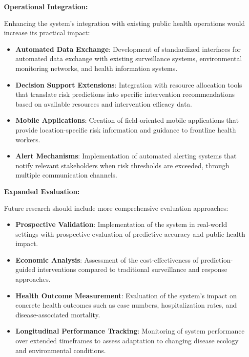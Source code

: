 \documentclass[12pt,a4paper]{report}
\begin{document}
\textbf{Operational Integration:}

Enhancing the system's integration with existing public health operations would increase its practical impact:

\begin{itemize}
    \item \textbf{Automated Data Exchange}: Development of standardized interfaces for automated data exchange with existing surveillance systems, environmental monitoring networks, and health information systems.
    
    \item \textbf{Decision Support Extensions}: Integration with resource allocation tools that translate risk predictions into specific intervention recommendations based on available resources and intervention efficacy data.
    
    \item \textbf{Mobile Applications}: Creation of field-oriented mobile applications that provide location-specific risk information and guidance to frontline health workers.
    
    \item \textbf{Alert Mechanisms}: Implementation of automated alerting systems that notify relevant stakeholders when risk thresholds are exceeded, through multiple communication channels.
\end{itemize}

\textbf{Expanded Evaluation:}

Future research should include more comprehensive evaluation approaches:

\begin{itemize}
    \item \textbf{Prospective Validation}: Implementation of the system in real-world settings with prospective evaluation of predictive accuracy and public health impact.
    
    \item \textbf{Economic Analysis}: Assessment of the cost-effectiveness of prediction-guided interventions compared to traditional surveillance and response approaches.
    
    \item \textbf{Health Outcome Measurement}: Evaluation of the system's impact on concrete health outcomes such as case numbers, hospitalization rates, and disease-associated mortality.
    
    \item \textbf{Longitudinal Performance Tracking}: Monitoring of system performance over extended timeframes to assess adaptation to changing disease ecology and environmental conditions.
\end{itemize}
\end{document}
